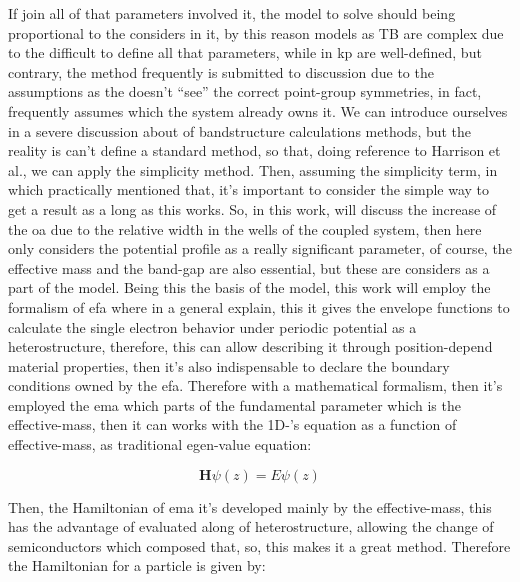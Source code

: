 If join all of that parameters involved it, the model to solve should being proportional to the considers in it, by this reason models as \gls{TB} are complex due to the difficult to define all that parameters, while in \gls{kp} are well-defined, but contrary, the method frequently is  submitted to discussion due to the assumptions as the doesn't ``see'' the correct point-group symmetries, in fact, frequently assumes which the system already owns it.  We can introduce ourselves in a severe discussion about of bandstructure calculations methods, but the reality is can't define a standard method, so that, doing reference to Harrison et al.\cite{harrison2016quantum}, we can apply the simplicity method.
Then, assuming the simplicity term, in which practically mentioned that, it's important to consider the simple way to get a result as a long as this works. So, in this work, will discuss the increase of the  \gls{oa}  due to the relative width in the wells of the coupled system, then here only considers the potential profile as a really significant parameter, of course, the effective mass and   the band-gap are also essential, but these are considers as a part of the model. Being this the basis of the model, this work will employ the formalism of \gls{efa} where in a general explain, this it  gives the envelope functions to calculate the single electron behavior under periodic potential as a heterostructure, therefore, this can allow describing it  through position-depend material properties\cite{foreman1996envelope,benduke1966spacecharge,bastard1990wave}, then it's also indispensable to declare the boundary conditions owned by the \gls{efa}. Therefore with a mathematical formalism, then it's employed the \gls{ema} which parts of the fundamental  parameter which is the effective-mass, then it can works with the 1D-\sch's equation as a function of effective-mass, as traditional egen-value equation:

\begin{equation}\label{eqn:chapter-2-sec-numerical-calculations-eigen-value-equation}
	\textbf{H}\psi(z)=E\psi(z)
\end{equation}

Then, the Hamiltonian of \gls{ema} it's developed mainly by the effective-mass, this has the advantage of evaluated along of heterostructure,  allowing  the change of semiconductors which composed that, so, this makes it a great method. Therefore the Hamiltonian for a particle is given by\cite{kamizato1989excitons,bastard1990wave,foreman1996envelope}:

